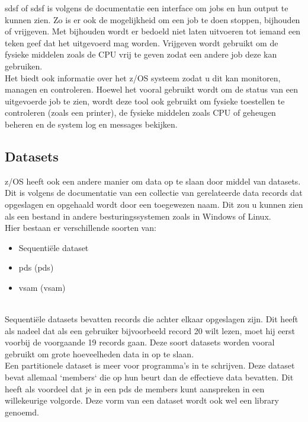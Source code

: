 \acrlong{sdsf} of \acrshort{sdsf} is volgens de \textcite{IBM2023} documentatie een interface om jobs en hun output te kunnen zien. Zo is er ook de mogelijkheid om een job te doen stoppen, bijhouden of vrijgeven. Met bijhouden wordt er bedoeld niet laten uitvoeren tot iemand een teken geef dat het uitgevoerd mag worden. Vrijgeven wordt gebruikt om de fysieke middelen zoals de CPU vrij te geven zodat een andere job deze kan gebruiken. \\ 
Het biedt ook informatie over het \gls{z/OS} systeem zodat u dit kan monitoren, managen en controleren. Hoewel het vooral gebruikt wordt om de status van een uitgevoerde job te zien, wordt deze tool ook gebruikt om fysieke toestellen te controleren (zoals een printer), de fysieke middelen zoals CPU of geheugen beheren en de system log en messages bekijken.

\subsection{Datasets}
z/OS heeft ook een andere manier om data op te slaan door middel van datasets. Dit is volgens de documentatie van \textcite{IBM} een collectie van gerelateerde data records dat opgeslagen en opgehaald wordt door een toegewezen naam. Dit zou u kunnen zien als een bestand in andere besturingssystemen zoals in Windows of Linux. \\

Hier bestaan er verschillende soorten van:

\begin{itemize}
    \item Sequentiële dataset
    \item \acrlong{pds} (\acrshort{pds})
    \item \acrlong{vsam} (\acrshort{vsam})
\end{itemize} \\

Sequentiële datasets bevatten records die achter elkaar opgeslagen zijn. Dit heeft als nadeel dat als een gebruiker bijvoorbeeld record 20 wilt lezen, moet hij eerst voorbij de voorgaande 19 records gaan. Deze soort datasets worden vooral gebruikt om grote hoeveelheden data in op te slaan. \autocite{IBM} \\

Een partitionele dataset is meer voor programma's in te schrijven. Deze dataset bevat allemaal `members` die op hun beurt dan de effectieve data bevatten. Dit heeft als voordeel dat je in een \acrshort{pds} de members kunt aanspreken in een willekeurige volgorde. Deze vorm van een dataset wordt ook wel een library genoemd. \autocite{IBM} \\

